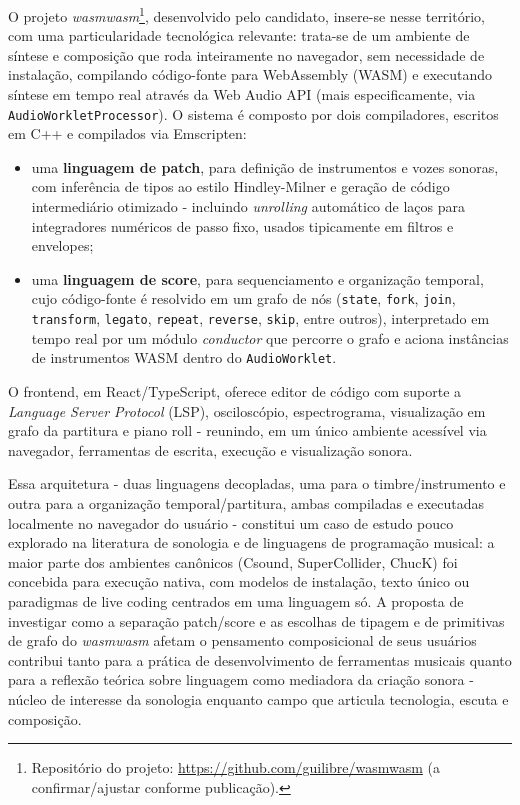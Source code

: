 \documentclass[12pt,a4paper]{article}
\begin{document}
O projeto \emph{wasmwasm}\footnote{Repositório do projeto: \url{https://github.com/guilibre/wasmwasm} (a confirmar/ajustar conforme publicação).}, desenvolvido pelo candidato, insere-se nesse território, com uma particularidade tecnológica relevante: trata-se de um ambiente de síntese e composição que roda inteiramente no navegador, sem necessidade de instalação, compilando código-fonte para WebAssembly (WASM) e executando síntese em tempo real através da Web Audio API (mais especificamente, via \texttt{AudioWorkletProcessor}). O sistema é composto por dois compiladores, escritos em C++ e compilados via Emscripten:

\begin{itemize}
  \item uma \textbf{linguagem de patch}, para definição de instrumentos e vozes sonoras, com inferência de tipos ao estilo Hindley-Milner e geração de código intermediário otimizado - incluindo \emph{unrolling} automático de laços para integradores numéricos de passo fixo, usados tipicamente em filtros e envelopes;
  \item uma \textbf{linguagem de score}, para sequenciamento e organização temporal, cujo código-fonte é resolvido em um grafo de nós (\texttt{state}, \texttt{fork}, \texttt{join}, \texttt{transform}, \texttt{legato}, \texttt{repeat}, \texttt{reverse}, \texttt{skip}, entre outros), interpretado em tempo real por um módulo \emph{conductor} que percorre o grafo e aciona instâncias de instrumentos WASM dentro do \texttt{AudioWorklet}.
\end{itemize}

O frontend, em React/TypeScript, oferece editor de código com suporte a \emph{Language Server Protocol} (LSP), osciloscópio, espectrograma, visualização em grafo da partitura e piano roll - reunindo, em um único ambiente acessível via navegador, ferramentas de escrita, execução e visualização sonora.

Essa arquitetura - duas linguagens decopladas, uma para o timbre/instrumento e outra para a organização temporal/partitura, ambas compiladas e executadas localmente no navegador do usuário - constitui um caso de estudo pouco explorado na literatura de sonologia e de linguagens de programação musical: a maior parte dos ambientes canônicos (Csound, SuperCollider, ChucK) foi concebida para execução nativa, com modelos de instalação, texto único ou paradigmas de live coding centrados em uma linguagem só. A proposta de investigar como a separação patch/score e as escolhas de tipagem e de primitivas de grafo do \emph{wasmwasm} afetam o pensamento composicional de seus usuários contribui tanto para a prática de desenvolvimento de ferramentas musicais quanto para a reflexão teórica sobre linguagem como mediadora da criação sonora - núcleo de interesse da sonologia enquanto campo que articula tecnologia, escuta e composição.
\end{document}
